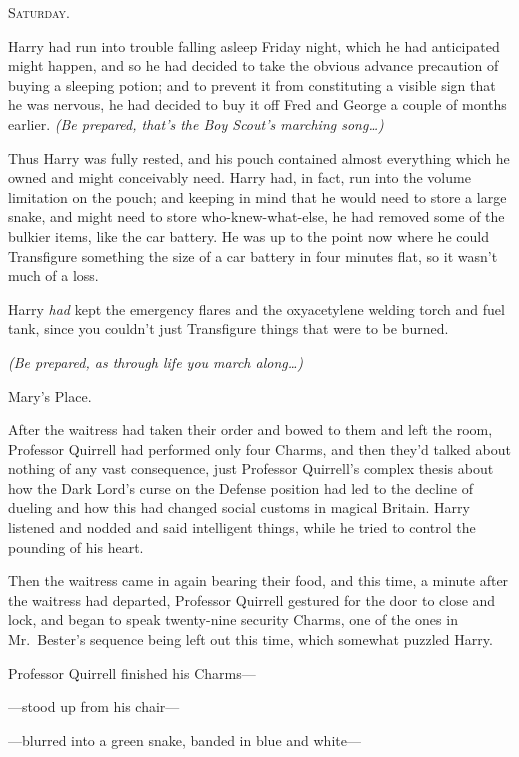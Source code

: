 
\lettrine{S}{aturday}.

\quad\quad
Harry had run into trouble falling asleep Friday night, which he had
anticipated might happen, and so he had decided to take the obvious advance
precaution of buying a sleeping potion; and to prevent it from constituting a
visible sign that he was nervous, he had decided to buy it off Fred and George
a couple of months earlier. \emph{(Be prepared, that's the Boy Scout's marching
song{\ldots})}

Thus Harry was fully rested, and his pouch contained almost everything which he
owned and might conceivably need. Harry had, in fact, run into the volume
limitation on the pouch; and keeping in mind that he would need to store a
large snake, and might need to store who-knew-what-else, he had removed some of
the bulkier items, like the car battery. He was up to the point now where he
could Transfigure something the size of a car battery in four minutes flat, so
it wasn't much of a loss.

Harry \emph{had} kept the emergency flares and the oxyacetylene welding torch
and fuel tank, since you couldn't just Transfigure things that were to be
burned.

\emph{(Be prepared, as through life you march along{\ldots})}

Mary's Place.

After the waitress had taken their order and bowed to them and left the room,
Professor Quirrell had performed only four Charms, and then they'd talked about
nothing of any vast consequence, just Professor Quirrell's complex thesis about
how the Dark Lord's curse on the Defense position had led to the decline of
dueling and how this had changed social customs in magical Britain. Harry
listened and nodded and said intelligent things, while he tried to control the
pounding of his heart.

Then the waitress came in again bearing their food, and this time, a minute
after the waitress had departed, Professor Quirrell gestured for the door to
close and lock, and began to speak twenty-nine security Charms, one of the ones
in Mr.~Bester's sequence being left out this time, which somewhat puzzled Harry.

Professor Quirrell finished his Charms---

---stood up from his chair---

---blurred into a green snake, banded in blue and white---

